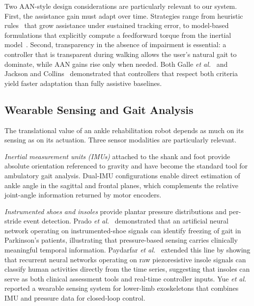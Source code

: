 \documentclass[conference]{IEEEtran}
\begin{document}
Two AAN-style design considerations are particularly relevant to our system. First, the assistance gain must adapt over time. Strategies range from heuristic rules~\cite{jackson2019heuristic} that grow assistance under sustained tracking error, to model-based formulations that explicitly compute a feedforward torque from the inertial model~\cite{zhang2015torque,perez2024modeling}. Second, transparency in the absence of impairment is essential: a controller that is transparent during walking allows the user's natural gait to dominate, while AAN gains rise only when needed. Both Galle \emph{et al.}~\cite{galle2013adaptation} and Jackson and Collins~\cite{jackson2019heuristic} demonstrated that controllers that respect both criteria yield faster adaptation than fully assistive baselines.

\subsection{Wearable Sensing and Gait Analysis}

The translational value of an ankle rehabilitation robot depends as much on its sensing as on its actuation. Three sensor modalities are particularly relevant.

\emph{Inertial measurement units (IMUs)} attached to the shank and foot provide absolute orientation referenced to gravity and have become the standard tool for ambulatory gait analysis. Dual-IMU configurations enable direct estimation of ankle angle in the sagittal and frontal planes, which complements the relative joint-angle information returned by motor encoders.

\emph{Instrumented shoes and insoles} provide plantar pressure distributions and per-stride event detection. Prado \emph{et al.}~\cite{prado2020fog} demonstrated that an artificial neural network operating on instrumented-shoe signals can identify freezing of gait in Parkinson's patients, illustrating that pressure-based sensing carries clinically meaningful temporal information. Paydarfar \emph{et al.}~\cite{paydarfar2020rnn} extended this line by showing that recurrent neural networks operating on raw piezoresistive insole signals can classify human activities directly from the time series, suggesting that insoles can serve as both clinical assessment tools and real-time controller inputs. Yue \emph{et al.}~\cite{yue2018wearable} reported a wearable sensing system for lower-limb exoskeletons that combines IMU and pressure data for closed-loop control.
\end{document}
